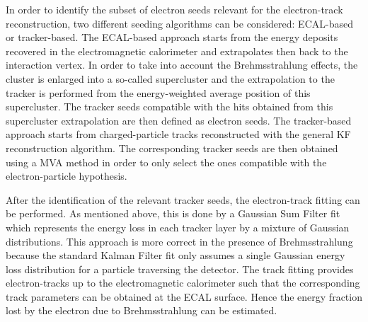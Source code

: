 In order to identify the subset of electron seeds relevant for the electron-track reconstruction, two different seeding algorithms can be considered: ECAL-based or tracker-based.
The ECAL-based approach starts from the energy deposits recovered in the electromagnetic calorimeter and extrapolates then back to the interaction vertex. In order to take into account the Brehmsstrahlung effects, the cluster is enlarged into a so-called supercluster and the extrapolation to the tracker is performed from the energy-weighted average position of this supercluster. The tracker seeds compatible with the hits obtained from this supercluster extrapolation are then defined as electron seeds. The tracker-based approach starts from charged-particle tracks reconstructed with the general KF reconstruction algorithm. The corresponding tracker seeds are then obtained using a MVA method in order to only select the ones compatible with the electron-particle hypothesis.

After the identification of the relevant tracker seeds, the electron-track fitting can be performed. As mentioned above, this is done by a Gaussian Sum Filter fit which represents the energy loss in each tracker layer by a mixture of Gaussian distributions. This approach is more correct in the presence of Brehmsstrahlung because the standard Kalman Filter fit only assumes a single Gaussian energy loss distribution for a particle traversing the detector. The track fitting provides electron-tracks up to the electromagnetic calorimeter such that the corresponding track parameters can be obtained at the ECAL surface. Hence the energy fraction lost by the electron due to Brehmsstrahlung can be estimated.



